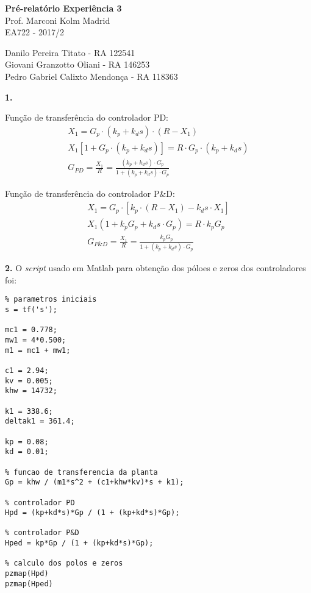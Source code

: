 \documentclass[a4paper,11pt]{article}
\begin{document}
\begin{center}
\textbf{Pré-relatório Experiência 3} \\
\hspace{5pt}
Prof. Marconi Kolm Madrid \\
EA722 - 2017/2
\end{center}

\begin{center}
Danilo Pereira Titato - RA 122541 \\
Giovani Granzotto Oliani - RA 146253 \\
Pedro Gabriel Calixto Mendonça - RA 118363 \\
\end{center}

\textbf{1.}

Função de transferência do controlador PD:
\begin{gather*}
    X_1 = G_p \cdot \left(k_p + k_ds\right) \cdot \left(R - X_1\right) \\
    X_1 \left[1 + G_p \cdot \left(k_p + k_ds\right)\right] =
        R \cdot G_p \cdot \left(k_p + k_ds\right) \\
    G_{PD} = \frac{X_1}{R} = \frac{\left(k_p + k_ds\right) \cdot G_p}
        {1 + \left(k_p + k_ds\right) \cdot G_p}
\end{gather*}

Função de transferência do controlador P\&D:
\begin{gather*}
    X_1 = G_p \cdot \left[k_p \cdot \left(R - X_1\right) -
        k_ds \cdot X_1\right] \\
    X_1 \left(1 + k_p G_p + k_ds \cdot G_p\right) = R \cdot k_p G_p \\
    G_{P\&D} = \frac{X_1}{R} = \frac{k_p G_p}
        {1 + \left(k_p + k_ds\right) \cdot G_p}
\end{gather*}

\textbf{2.} O \textit{script} usado em Matlab para obtenção dos póloes e zeros
dos controladores foi:

\begin{lstlisting}
% parametros iniciais
s = tf('s');

mc1 = 0.778;
mw1 = 4*0.500;
m1 = mc1 + mw1;

c1 = 2.94;
kv = 0.005;
khw = 14732;

k1 = 338.6;
deltak1 = 361.4;

kp = 0.08;
kd = 0.01;

% funcao de transferencia da planta
Gp = khw / (m1*s^2 + (c1+khw*kv)*s + k1);

% controlador PD
Hpd = (kp+kd*s)*Gp / (1 + (kp+kd*s)*Gp);

% controlador P&D
Hped = kp*Gp / (1 + (kp+kd*s)*Gp);

% calculo dos polos e zeros
pzmap(Hpd)
pzmap(Hped)
\end{lstlisting}
\end{document}
